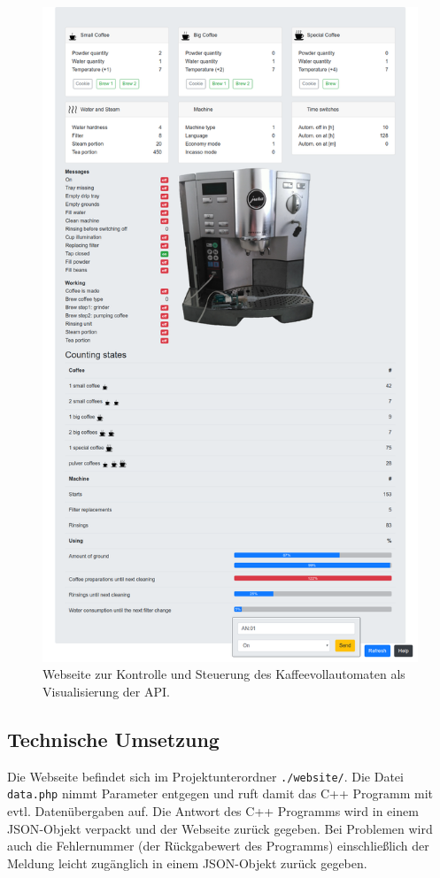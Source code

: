 \begin{figure}
  \begin{center}
    \includegraphics[scale=0.3]{images/chapter_4/Webseite}
    \caption{Webseite zur Kontrolle und Steuerung des Kaffeevollautomaten als Visualisierung der API.}
    \label{fig:website}
  \end{center}
\end{figure}

\subsection{Technische Umsetzung}
Die Webseite befindet sich im Projektunterordner \texttt{./website/}.
Die Datei \texttt{data.php} nimmt Parameter entgegen und ruft damit das C++ Programm mit evtl. Datenübergaben auf.
Die Antwort des C++ Programms wird in einem \ac{JSON}-Objekt verpackt und der Webseite zurück gegeben.
Bei Problemen wird auch die Fehlernummer (der Rückgabewert des Programms) einschließlich der Meldung leicht zugänglich in einem \ac{JSON}-Objekt zurück gegeben.

